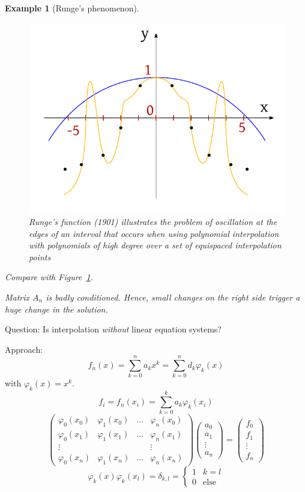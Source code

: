 \documentclass{article}
\newtheorem{example}{Example}
\begin{document}
\begin{example}[Runge's phenomenon]
  \begin{figure}[!h]
    \begin{center}
      \includegraphics{img/01_runge_function.pdf}
      \caption{Runge's function (1901) illustrates the problem of oscillation at the edges of an interval that occurs when using polynomial interpolation with polynomials of high degree over a set of equispaced interpolation points}
      \label{img:runge}
    \end{center}
  \end{figure}

  Compare with Figure~\ref{img:runge}.

  Matrix $A_n$ is badly conditioned. Hence, small changes on the right side trigger a huge change in the solution.
\end{example}

Question: Is interpolation \emph{without} linear equation systems?


Approach:
\[ f_n(x) = \sum_{k=0}^n a_k x^k = \sum_{k=0}^n d_k \varphi_k(x) \]
with $\varphi_k(x) = x^k$.
\[ f_i = f_n(x_i) = \sum_{k=0}^k a_k \varphi_k(x_i) \]
\[
  \begin{pmatrix}
    \varphi_0(x_0) & \varphi_1(x_0) & \dots & \varphi_n(x_0) \\
    \varphi_0(x_1) & \varphi_1(x_1) & \dots & \varphi_n(x_1) \\
    \vdots & & & \vdots \\
    \varphi_0(x_n) & \varphi_1(x_n) & \dots & \varphi_n(x_n)
  \end{pmatrix}
  \begin{pmatrix}
    a_0 \\ a_1 \\ \vdots \\ a_n
  \end{pmatrix}
  =
  \begin{pmatrix}
    f_0 \\ f_1 \\ \vdots \\ f_n
  \end{pmatrix}
\]
\[ \varphi_k(x) \varphi_k(x_l) = \delta_{k,l} = \begin{cases} 1 & k=l \\ 0 & \text{else} \end{cases} \]
\end{document}
